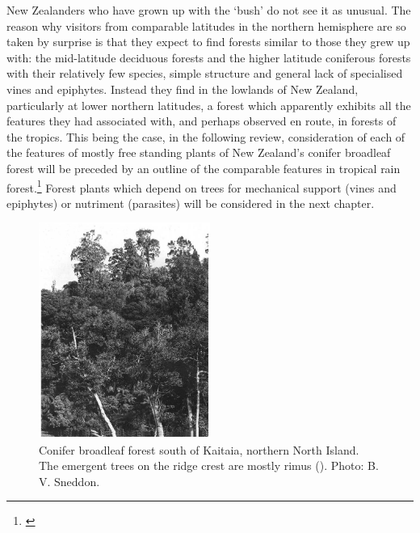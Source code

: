 New Zealanders who have grown up with the `bush' do not see it as unusual.
The reason why visitors from comparable latitudes in the northern hemisphere are so taken by surprise is that they expect to find forests similar to those they grew up with: the mid-latitude deciduous forests and the higher latitude coniferous forests with their relatively few species, simple structure and general lack of specialised vines and epiphytes.
Instead they find in the lowlands of New Zealand, particularly at lower northern latitudes, a forest which apparently exhibits all the features they had associated with, and perhaps observed en route, in forests of the tropics.
This being the case, in the following review, consideration of each of the features of mostly free standing plants of New Zealand's conifer broadleaf forest will be preceded by an outline of the comparable features in tropical rain forest.\footnote{\cite{richards1952tropical}}
Forest plants which depend on trees for mechanical support (vines and epiphytes) or nutriment (parasites) will be considered in the next chapter.

\begin{figure}
	\includegraphics[width=0.5\textwidth]{graphics/figure7conifer.jpg}
	\centering
	\caption[Conifer broadleaf forest south of Kaitaia]{Conifer broadleaf forest south of Kaitaia, northern North Island.
The emergent trees on the ridge crest are mostly rimus ().
	Photo: B. V. Sneddon.}
	\label{fig:7conifer}
\end{figure}

